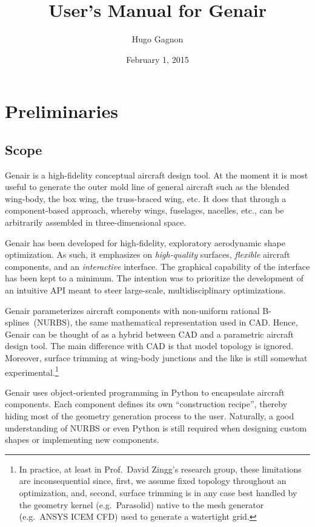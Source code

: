\documentclass[]{article}
\title{User's Manual for Genair}
\author{Hugo Gagnon}
\date{February 1, 2015}
\begin{document}
\maketitle
\tableofcontents


\newpage
\section{Preliminaries}

\subsection{Scope}
\label{subsec:scope}

Genair is a high-fidelity conceptual aircraft design tool.  At the 
moment it is most useful to generate the outer mold line of general 
aircraft such as the blended wing-body, the box wing, the truss-braced 
wing, etc.  It does that through a component-based approach, whereby 
wings, fuselages, nacelles, etc., can be arbitrarily assembled in 
three-dimensional space.

Genair has been developed for high-fidelity, exploratory aerodynamic 
shape optimization.  As such, it emphasizes on \emph{high-quality} 
surfaces, \emph{flexible} aircraft components, and an \emph{interactive} 
interface.  The graphical capability of the interface has been kept to a 
minimum.  The intention was to prioritize the development of an 
intuitive API meant to steer large-scale, multidisciplinary 
optimizations.

Genair parameterizes aircraft components with non-uniform rational 
B-spli\-nes~(NURBS), the same mathematical representation used in CAD.  
Hence, Genair can be thought of as a hybrid between CAD and a parametric 
aircraft design tool.  The main difference with CAD is that model 
topology is ignored.  Moreover, surface trimming at wing-body junctions 
and the like is still somewhat experimental.\footnote{In practice, at 
least in Prof.\ David Zingg's research group, these limitations are 
inconsequential since, first, we assume fixed topology throughout an 
optimization, and, second, surface trimming is in any case best handled 
by the geometry kernel (e.g.\ Parasolid) native to the mesh generator 
(e.g.\ ANSYS ICEM CFD) used to generate a watertight grid.}

Genair uses object-oriented programming in Python to encapsulate 
aircraft components.  Each component defines its own ``construction 
recipe'', thereby hiding most of the geometry generation process to the 
user.  Naturally, a good understanding of NURBS or even Python is still 
required when designing custom shapes or implementing new components.
\end{document}
